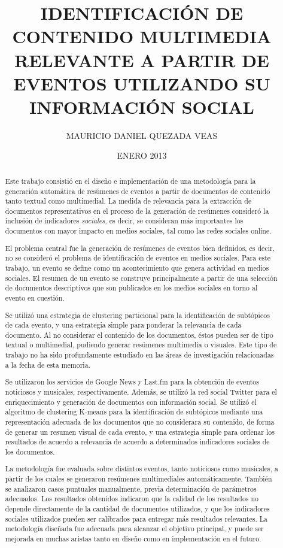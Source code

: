 \documentclass[upright, contnum]{umemoria}
\author{MAURICIO DANIEL QUEZADA VEAS}
\title{IDENTIFICACI\'ON DE CONTENIDO MULTIMEDIA RELEVANTE A PARTIR DE EVENTOS UTILIZANDO SU INFORMACI\'ON SOCIAL}
\date{ENERO 2013}
\begin{document}
\frontmatter
\maketitle

\begin{abstract}

Este trabajo consistió en el diseño e implementación de una metodología para la generación automática
de resúmenes de eventos a partir de documentos de contenido tanto textual como multimedial. La medida de relevancia para
la extracción de documentos representativos en el proceso de la generación de resúmenes consideró la inclusión de indicadores
\textit{sociales}, es decir, se consideran más importantes los documentos con mayor impacto en medios sociales, tal como
las redes sociales online.

El problema central fue la generación de resúmenes de eventos bien definidos, es decir, no se consideró el problema
de identificación de eventos en medios sociales. Para este trabajo, un evento se define como un acontecimiento que genera actividad en medios sociales. El resumen de un evento se construye principalmente a partir de una selección de documentos descriptivos que son publicados en los medios sociales en torno al evento en cuestión.

Se utilizó una estrategia de clustering particional para la identificación
de subtópicos de cada evento, y una estrategia simple para ponderar la relevancia de cada documento. Al no considerar
el contenido de los documentos, éstos pueden ser de tipo textual o multimedial, pudiendo generar resúmenes multimedia o visuales.
Este tipo de trabajo no ha sido profundamente estudiado en las áreas de investigación relacionadas a la fecha de esta memoria.

Se utilizaron los servicios de Google News y Last.fm para la obtención de eventos noticiosos y musicales, respectivamente.
Además, se utilizó la red social Twitter para el enriquecimiento y generación de documentos con información social. Se utilizó el
algoritmo de clustering K-means para la identificación de subtópicos mediante una representación adecuada de los documentos que
no considerara su contenido, de forma de generar un resumen visual de cada evento, y una estrategia simple para ordenar los resultados de acuerdo a relevancia de acuerdo a determinados indicadores sociales de los documentos.

La metodología fue evaluada sobre distintos eventos, tanto noticiosos como musicales, a partir de los cuales se generaron resúmenes multimediales automáticamente. También se analizaron casos puntuales manualmente, previa determinación de parámetros adecuados. Los resultados obtenidos indicaron que la calidad de los resultados no depende directamente de la cantidad de documentos utilizados, y que los indicadores sociales utilizados pueden ser calibrados para entregar más resultados relevantes. La metodología diseñada fue adecuada para alcanzar el objetivo principal, y puede ser mejorada en muchas aristas tanto en diseño como en implementación en el futuro.

\end{abstract}
\end{document}
